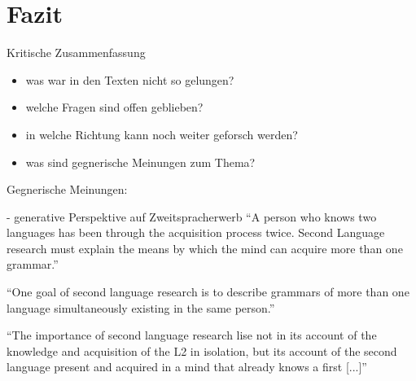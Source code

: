 \section{Fazit}

Kritische Zusammenfassung
\begin{itemize}
    \item was war in den Texten nicht so gelungen?
    \item welche Fragen sind offen geblieben?
    \item in welche Richtung kann noch weiter geforsch werden?
    \item was sind gegnerische Meinungen zum Thema?
\end{itemize}

Gegnerische Meinungen:

\cite{Cook93} - generative Perspektive auf Zweitspracherwerb
``A person who knows two languages has been through the acquisition process twice.
Second Language research must explain the means by which the mind can acquire more than one grammar.''

``One goal of second language research is to describe grammars of more than one language simultaneously existing in the same person.''

``The importance of second language research lise not in its account of the knowledge and acquisition of the L2 in isolation, but its account of the second language present and acquired in a mind that already knows a first [...]''
